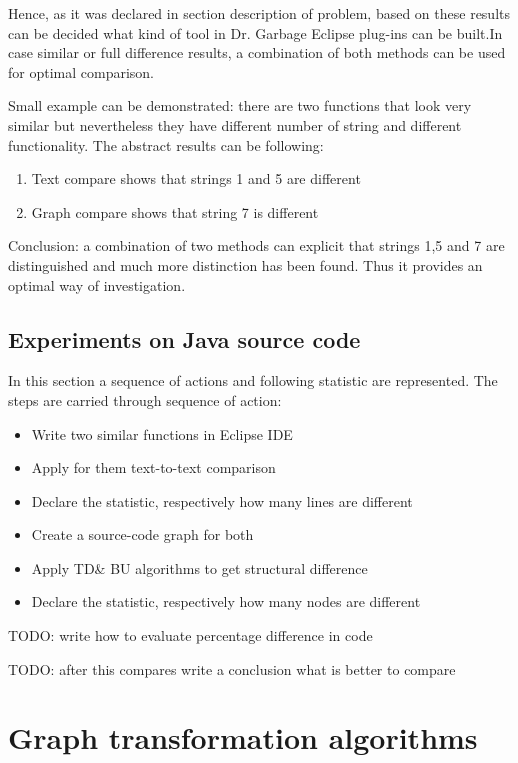 \documentclass{report}
\begin{document}
Hence, as it was declared in section description of problem, based on these results can be decided what kind of tool in Dr. Garbage Eclipse plug-ins can be built.In case similar or full difference results, a combination of both methods can be used for optimal comparison. 

Small example can be demonstrated: there are two functions that look very similar but nevertheless they have different number of string and different functionality. The abstract results can be following:
\begin{enumerate}
	\item Text compare shows that strings 1 and 5 are different
	\item Graph compare shows that string 7 is different 
\end{enumerate}

Conclusion: a combination of two methods can explicit that strings 1,5 and 7 are distinguished and much more distinction has been found. Thus it provides an optimal way of investigation.

\section{Experiments on Java source code}

In this section a sequence of actions and following statistic are represented. The steps are carried through sequence of action:
\begin{itemize}
	\item Write two similar functions in Eclipse IDE
	\item Apply for them text-to-text comparison
	\item Declare the statistic, respectively how many lines are different		
	\item Create a source-code graph for both
	\item Apply TD\& BU algorithms to get structural difference	
	\item Declare the statistic, respectively how many nodes are different			
\end{itemize}

TODO: write how to evaluate percentage difference in code

TODO: after this compares write a conclusion what is better to compare


\chapter{Graph transformation algorithms}
\label{cha:Algorithms}
\end{document}
